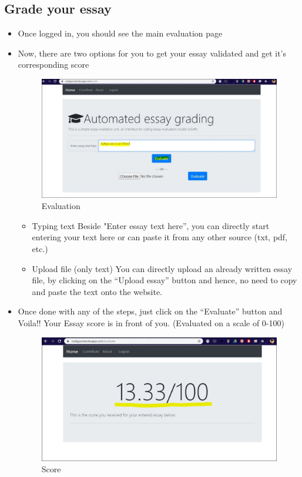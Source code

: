 \documentclass{article}
\begin{document}
\subsection{Grade your essay}
\begin{itemize}
    \item Once logged in, you should see the main evaluation page
    \item Now, there are two options for you to get your essay validated and get it’s corresponding score
    \begin{figure}
    \includegraphics[width=11cm]{2}
    \caption{\label{fig:your-figure2}Evaluation}
    \end{figure}
    \begin{itemize}
        \item Typing text
            Beside "Enter essay text here”, you can directly start entering your text here or can paste it from any other source (txt, pdf, etc.)
        \item Upload file (only text)
            You can directly upload an already written essay file, by clicking on the “Upload essay” button and hence, no need to copy and paste the text onto the website.
    \end{itemize}
    \item Once done with any of the steps, just click on the “Evaluate” button and Voila!! Your Essay score is in front of you. (Evaluated on a scale of 0-100)
    \begin{figure}
    \includegraphics[width=11cm]{1}
    \caption{\label{fig:your-figure2}Score}
    \end{figure}
\end{itemize}
\end{document}
